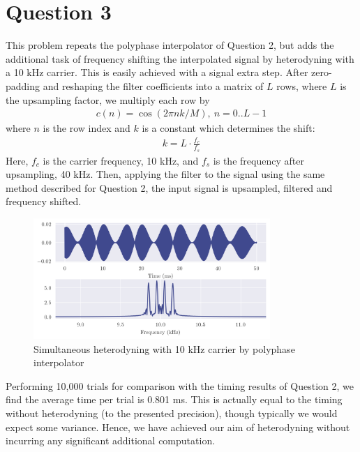 \section*{Question 3}

This problem repeats the polyphase interpolator of Question 2, but adds the additional task of frequency shifting the interpolated signal by heterodyning with a 10 kHz carrier. This is easily achieved with a signal extra step. After zero-padding and reshaping the filter coefficients into a matrix of $L$ rows, where $L$ is the upsampling factor, we multiply each row by
\begin{align}
    c(n) = \cos(2\pi nk/M),\ n = 0..L-1
\end{align}
where $n$ is the row index and $k$ is a constant which determines the shift:
\begin{align}
    k = L \cdot \frac{f_c}{f_s}
\end{align}
Here, $f_c$ is the carrier frequency, 10 kHz, and $f_s$ is the frequency after upsampling, 40 kHz. Then, applying the filter to the signal using the same method described for Question 2, the input signal is upsampled, filtered and frequency shifted.

\begin{figure}[ht]
    \centering
    \includegraphics[width=0.8\textwidth]{images/q3_heterodyne.png}
    \caption{Simultaneous heterodyning with 10 kHz carrier by polyphase interpolator}
    \label{fig:q3_heterodyne}
\end{figure}

Performing 10,000 trials for comparison with the timing results of Question 2, we find the average time per trial is 0.801 ms. This is actually equal to the timing without heterodyning (to the presented precision), though typically we would expect some variance. Hence, we have achieved our aim of heterodyning without incurring any significant additional computation.
